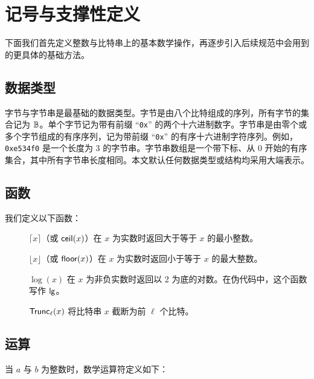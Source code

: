 
\section{记号与支撑性定义}
\label{sec:notation}

下面我们首先定义整数与比特串上的基本数学操作，再逐步引入后续规范中会用到的更具体的基础方法。

\subsection{数据类型}

字节与字节串是最基础的数据类型。字节是由八个比特组成的序列，所有字节的集合记为 $\mathbb{B}$。单个字节记为带有前缀 ``\texttt{0x}'' 的两个十六进制数字。字节串是由零个或多个字节组成的有序序列，记为带前缀 ``\texttt{0x}'' 的有序十六进制字符序列。例如，\texttt{0xe534f0} 是一个长度为 3 的字节串。字节串数组是一个带下标、从 0 开始的有序集合，其中所有字节串长度相同。本文默认任何数据类型或结构均采用大端表示。

\subsection{函数}

我们定义以下函数：
\begin{description}
    \item[]$\lceil x \rceil$（或 $\textsf{ceil}(x)$）在 $x$ 为实数时返回大于等于 $x$ 的最小整数。
    \item[]$\lfloor x \rfloor$（或 $\textsf{floor}(x)$）在 $x$ 为实数时返回小于等于 $x$ 的最大整数。
    \item[]$\log(x)$ 在 $x$ 为非负实数时返回以 2 为底的对数。在伪代码中，这个函数写作 $\textsf{lg}$。
    \item[]$\textsf{Trunc}_\ell(x)$ 将比特串 $x$ 截断为前 $\ell$ 个比特。
\end{description}

\subsection{运算}

当 $a$ 与 $b$ 为整数时，数学运算符定义如下：


